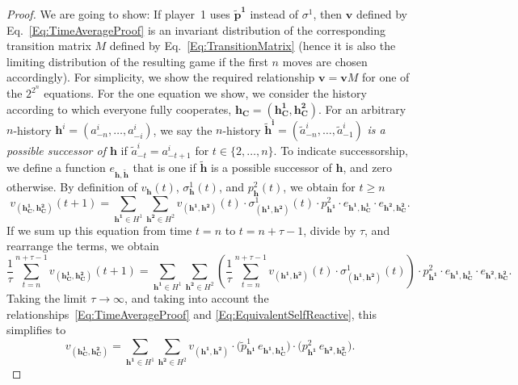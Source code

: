 \documentclass[11pt]{article}
\theoremstyle{plainCl1}
\theoremstyle{plainCl2}
\begin{document}
\begin{proof}
We are going to show: If player~1 uses $\mathbf{\tilde p^1}$ instead of $\sigma^1$, then $\mathbf{v}$ defined by Eq.~\eqref{Eq:TimeAverageProof} is an invariant distribution of the corresponding transition matrix $M$ defined by Eq.~\eqref{Eq:TransitionMatrix} (hence it is also the limiting distribution of the resulting game if the first $n$ moves are chosen accordingly). For simplicity, we show the required relationship $\mathbf{v}\!=\!\mathbf{v}M$ for one of the $2^{2^n}$ equations. For the one equation we show, we consider the history according to which everyone fully cooperates, $\mathbf{h_C}\!=\!(\mathbf{h^1_C},\mathbf{ h^2_C})$. For an arbitrary $n$-history $\mathbf{h}^i=(a^i_{-n},\ldots,a^i_{-i})$, we say the $n$-history $\mathbf{\tilde h^i}=(\tilde a^i_{-n},\ldots, \tilde a^i_{-1})$ {\it is a possible successor of $\mathbf{h}$} if $\tilde a^i_{-t} = a^i_{-t+1}$ for $t\!\in\!\{2,\ldots,n\}$. To indicate successorship, we define a function $e_{\mathbf{h},\mathbf{\tilde h}}$ that is one if $\mathbf{\tilde h}$ is a possible successor of $\mathbf{h}$, and zero otherwise. 
By definition of $v_\mathbf{h}(t)$, $\sigma_\mathbf{h}^1(t)$, and $p^2_\mathbf{h}(t)$, we obtain for $t\!\ge\!n$
\begin{equation}
v_{(\mathbf{h^1_C},\mathbf{h^2_C})} (t\!+\!1)
= \sum_{\mathbf{h^1}\in H^1}\sum_{\mathbf{h^2}\in H^2} v_{(\mathbf{h^1},\mathbf{h^2})}(t)\cdot  \sigma^1_{(\mathbf{h^1},\mathbf{h^2})}(t) \cdot p^2_\mathbf{h^1} \cdot e_{\mathbf{h^1},\mathbf{h^1_C}} \cdot e_{\mathbf{h^2},\mathbf{h^2_C}}.
\end{equation}
If we sum up this equation from time $t\!=\!n$ to $t\!=\!n\!+\!\tau\!-\!1$, divide by $\tau$, and rearrange the terms, we obtain
\begin{equation}
\frac{1}{\tau}\sum_{t=n}^{n+\tau-1} v_{(\mathbf{h^1_C},\mathbf{h^2_C})} (t\!+\!1) 
= \sum_{\mathbf{h^1}\in H^1} \sum_{\mathbf{h^2}\in H^2} \left(\frac{1}{\tau}\sum_{t=n}^{n+\tau-1} v_{(\mathbf{h^1},\mathbf{h^2})}(t)\cdot  \sigma^1_{(\mathbf{h^1},\mathbf{h^2})}(t)\right) \cdot p^2_\mathbf{h^1} \cdot e_{\mathbf{h^1},\mathbf{h^1_C}} \cdot e_{\mathbf{h^2},\mathbf{h^2_C}}.
\end{equation}
Taking the limit $\tau\to\infty$, and taking into account the relationships~\eqref{Eq:TimeAverageProof} and \eqref{Eq:EquivalentSelfReactive}, this simplifies to
\begin{equation} 
v_{(\mathbf{h^1_C},\mathbf{h^2_C})}
= \sum_{\mathbf{h^1}\in H^1}\sum_{\mathbf{h^2} \in H^2} v_{(\mathbf{h^1}, \mathbf{h^2})} \cdot \big(\tilde p^1_{\mathbf{h^1}} \, e_{\mathbf{h^1},\mathbf{h^1_C}}\big) \cdot \big(p^2_\mathbf{h^1} \, e_{\mathbf{h^2},\mathbf{h^2_C}}\big).

\end{equation}
\end{proof}
\end{document}
